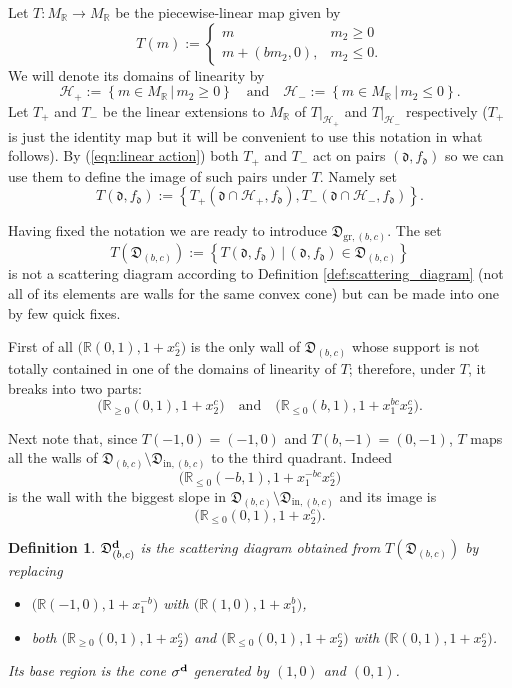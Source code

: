 \documentclass[11pt]{amsart}
\newtheorem{defn}[theorem]{Definition}
\theoremstyle{remark}
\numberwithin{equation}{section}
\newcommand{\RR}{\mathbb{R}}
\newcommand{\fd}{\mathfrak{d}}
\newcommand{\fD}{\mathfrak{D}}
\newcommand{\bfd}{{\bf d}}
\begin{document}
Let $T:M_\RR\rightarrow M_\RR$ be the piecewise-linear map given by
\[
  T (m) := 
  \begin{cases}
    m   & m_2 \geq 0 \\
    m + (bm_2,0), & m_2 \leq 0.
  \end{cases}
\]
We will denote its domains of linearity by 
\[ 
  \mathcal{H}_{+} := 
  \left\{ m \in M_{\mathbb{R}}\, |\, m_2 \geq 0 \right\} 
  \quad
  \mbox{and}
  \quad
  \mathcal{H}_{-} := 
  \left\{ m \in M_{\mathbb{R}} \,|\, m_2 \leq 0 \right\}.
\]
Let $T_+$ and $T_-$ be the linear extensions to $M_\RR$ of $T|_{\mathcal{H}_+}$
and $T|_{\mathcal{H}_-}$ respectively ($T_+$ is just the identity map but it
will be convenient to use this notation in what follows). 
By (\ref{eqn:linear action}) both $T_+$ and $T_-$ act on pairs $(\fd,f_\fd)$ so
we can use them to define the image of such pairs under $T$. Namely set
\[
  T(\fd,f_\fd):=
  \left\{
    T_+\left(\fd\cap\mathcal{H}_+,f_\fd\right),
    T_-\left(\fd\cap\mathcal{H}_-,f_\fd\right)
  \right\}.
\]

Having fixed the notation we are ready to introduce $\fD_{\mathrm{gr},(b,c)}$.
The set
\[
  T(\fD_{(b,c)}):=
  \left\{
    T(\fd,f_\fd)\, |\, (\fd,f_\fd)\in \fD_{(b,c)}
  \right\}
\]
is not a scattering diagram according to Definition 
\ref{def:scattering_diagram} (not all of its elements are walls for the same
convex cone) but can be made into one by few quick fixes.

First of all $\big( \RR (0,1), 1+x_2^c\big)$ is the only wall of $\fD_{(b,c)}$
whose support is not totally contained in one of the domains of linearity of
$T$; therefore, under $T$, it breaks into two parts:
\[
  \big( \RR_{\ge0} (0,1), 1+x_2^c\big)
  \quad
  \mbox{and}
  \quad
  \big( \RR_{\le 0} (b,1), 1+x_1^{bc}x_2^c\big).
\]

Next note that, since $T(-1,0)=(-1,0)$ and $T(b,-1)=(0,-1)$, $T$ maps all the
walls of $\fD_{(b,c)}\setminus\fD_{\mathrm{in},(b,c)}$ to the third quadrant. 
Indeed 
\[
  \big(\RR_{\leq0}(-b,1),1+x_1^{-bc}x_2^c\big)
\]
is the wall with the biggest slope in
$\fD_{(b,c)}\setminus\fD_{\mathrm{in},(b,c)}$ and its image is 
\[
  \big( \RR_{\le0} (0,1), 1+x_2^c\big).
\]

\begin{defn}
  $\fD_{(b,c)}^\bfd$ is the scattering diagram obtained from
  $T\left(\fD_{(b,c)}\right)$ by replacing 
  \begin{itemize}
    \item
      $\big(\RR (-1,0), 1+x_1^{-b}\big)$ with $\big(\RR  (1,0), 1+x_1^b\big)$,
    \item 
      both $ \big( \RR_{\ge0} (0,1), 1+x_2^c\big)$ and $\big( \RR_{\le0} (0,1),
      1+x_2^c\big)$ with $ \big( \RR (0,1), 1+x_2^c\big)$.
  \end{itemize}
  Its base region is the cone $\sigma^\bfd$ generated by $(1,0)$ and $(0,1)$.
\end{defn}
\end{document}
